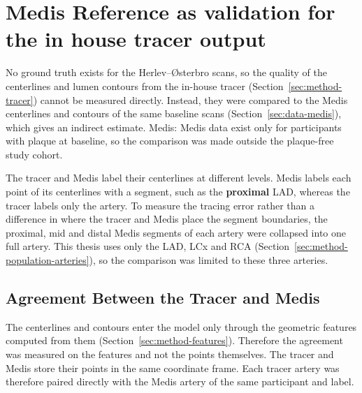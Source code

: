 \section{Medis Reference as validation for the in house tracer output}
\label{sec:method-medis}

No ground truth exists for the Herlev--{\O}sterbro scans, so the quality of the centerlines and lumen contours from the in-house tracer (Section~\ref{sec:method-tracer}) cannot be measured directly.
Instead, they were compared to the Medis centerlines and contours of the same baseline scans (Section~\ref{sec:data-medis}), which gives an indirect estimate.
Medis:  
Medis data exist only for participants with plaque at baseline, so the comparison was made outside the plaque-free study cohort.

The tracer and Medis label their centerlines at different levels.
Medis labels each point of its centerlines with a segment, such as the \textbf{proximal} LAD, whereas the tracer labels only the artery.
To measure the tracing error rather than a difference in where the tracer and Medis place the segment boundaries, the proximal, mid and distal Medis segments of each artery were collapsed into one full artery.
This thesis uses only the LAD, LCx and RCA (Section~\ref{sec:method-population-arteries}), so the comparison was limited to these three arteries.

\subsection{Agreement Between the Tracer and Medis}
\label{sec:method-medis-agreement}
The centerlines and contours enter the model only through the geometric features computed from them (Section~\ref{sec:method-features}).                                                                           
Therefore the agreement was measured on the features and not the points themselves.
The tracer and Medis store their points in the same coordinate frame.
Each tracer artery was therefore paired directly with the Medis artery of the same participant and label.

